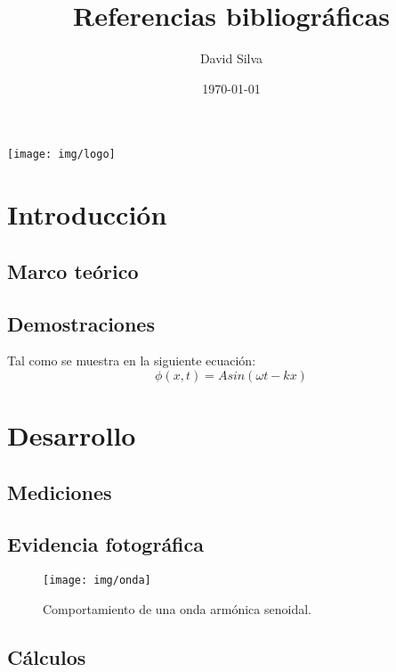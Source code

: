 \documentclass{article}
\author{David Silva}
\date{\today}
\title{Referencias bibliográficas}
\begin{document}
	\maketitle
	\vspace{2cm}
	\begin{center}
		\texttt{[image: img/logo]}
	\end{center}

	\newpage
	\tableofcontents
	
	\newpage
	\section{Introducción}
	\lipsum[1-4]
	\subsection{Marco teórico}
	\lipsum[1-2]
	\subsection{Demostraciones}
	\lipsum[1]
	
	Tal como se muestra en la siguiente ecuación:
	\begin{equation}
		\phi (x,t) = A sin (\omega t - kx)
		\label{eq:Onda}
	\end{equation}
	
	
	\section{Desarrollo}
	\lipsum[3-5]
	\subsection{Mediciones}
	\lipsum[1-2]
	
	\lipsum[3-4]
	\subsection{Evidencia fotográfica}
	
	\begin{figure}[h]
		\centering
		\texttt{[image: img/onda]}
		\label{fig:Onda}
		\caption{Comportamiento de una onda armónica senoidal.}
	\end{figure}
		
	
	\subsection{Cálculos}
	
\end{document}
